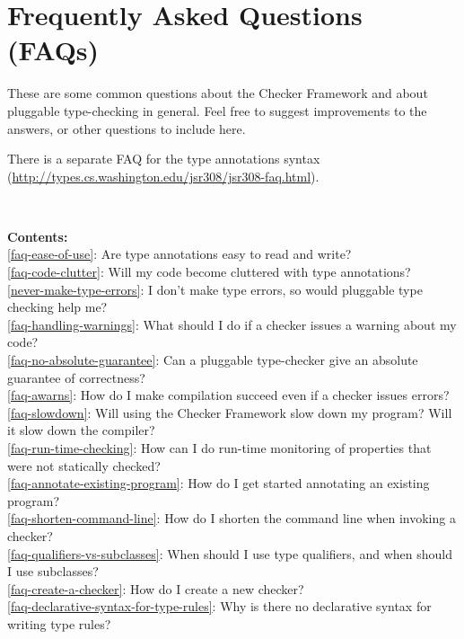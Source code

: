 \htmlhr
\chapter{Frequently Asked Questions (FAQs)\label{faq}}

These are some common questions about the Checker Framework and about
pluggable type-checking in general.  Feel free to suggest improvements to
the answers, or other questions to include here.

There is a separate FAQ for the type annotations syntax
(\url{http://types.cs.washington.edu/jsr308/jsr308-faq.html}).


~

\noindent
\textbf{Contents:} \\
\ref{faq-ease-of-use}: Are type annotations easy to read and write? \\
\ref{faq-code-clutter}: Will my code become cluttered with type annotations? \\
\ref{never-make-type-errors}: I don't make type errors, so would pluggable type checking help me? \\
\ref{faq-handling-warnings}: What should I do if a checker issues a warning about my code? \\
\ref{faq-no-absolute-guarantee}: Can a pluggable type-checker give an absolute guarantee of correctness? \\
\ref{faq-awarns}: How do I make compilation succeed even if a checker issues errors? \\
\ref{faq-slowdown}: Will using the Checker Framework slow down my program?  Will it slow down the compiler? \\
\ref{faq-run-time-checking}: How can I do run-time monitoring of properties that were not statically checked? \\
\ref{faq-annotate-existing-program}: How do I get started annotating an existing program? \\
\ref{faq-shorten-command-line}: How do I shorten the command line when invoking a checker? \\
\ref{faq-qualifiers-vs-subclasses}: When should I use type qualifiers, and when should I use subclasses? \\
\ref{faq-create-a-checker}: How do I create a new checker? \\
\ref{faq-declarative-syntax-for-type-rules}: Why is there no declarative syntax for writing type rules? \\
